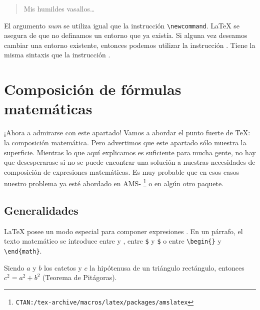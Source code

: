 \begin{example}
\newenvironment{king}
    {\begin{quote}}{\end{quote}}
\begin{king}
Mis humildes vasallos\ldots
\end{king}
\end{example}

El  argumento   \emph{num}  se   utiliza  igual  que   la  instrucción
\verb|\newcommand|. \LaTeX{} se asegura de que no definamos un entorno
que ya existía. Si alguna  vez deseamos cambiar una entorno existente,
entonces podemos utilizar  la instrucción . Tiene
la misma sintaxis que la instrucción .


\section{Composición de fórmulas matemáticas}

\begin{intro}
¡Ahora  a  admirarse con  este  apartado!  Vamos  a abordar  el  punto
fuerte  de  \TeX:  la  composición  matemática.  Pero  advertimos  que
este  apartado  sólo  muestra  la superficie.  Mientras  lo  que  aquí
explicamos es  suficiente para mucha  gente, no hay  que desesperarase
si  no  se  puede  encontrar   una  solución  a  nuestras  necesidades
de  composición  de  expresiones  matemáticas.  Es  muy  probable  que
en  esos  casos  nuestro  problema ya  esté  abordado  en  AMS-\LaTeXe
\footnote{\texttt{CTAN:/tex-archive/macros/latex/packages/amslatex}} o
en algún otro paquete.
\end{intro}

\subsection{Generalidades}

\LaTeX{}   posee   un   modo  especial   para   componer   expresiones
.  En un  párrafo,  el texto  matemático se  introduce
entre   \ci{(}    y   \ci{)},       entre
\texttt{\$}  y \texttt{\$}  o entre  \verb|\begin{|\verb|}| y
\verb|\end{math}|. 

\begin{example}
Siendo $a$ y $b$ los catetos
y $c$ la hipótenusa
de un triángulo rectángulo,
entonces $c^{2}=a^{2}+b^{2}$
(Teorema de Pitágoras).
\end{example}

